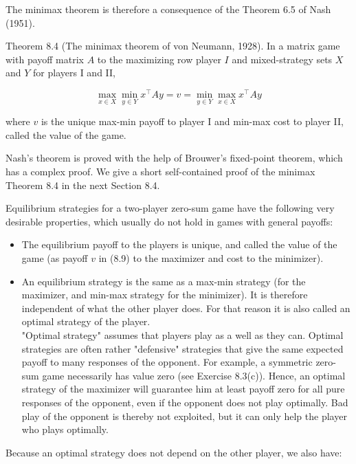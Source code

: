 \documentclass[12pt]{article}
\begin{document}
The minimax theorem is therefore a consequence of the Theorem 6.5 of Nash (1951).

Theorem 8.4 (The minimax theorem of von Neumann, 1928). In a matrix game with payoff matrix $A$ to the maximizing row player $I$ and mixed-strategy sets $X$ and $Y$ for players I and II,


\begin{equation*}
\max _{x \in X} \min _{y \in Y} x^{\top} A y=v=\min _{y \in Y} \max _{x \in X} x^{\top} A y \tag{8.9}
\end{equation*}


where $v$ is the unique max-min payoff to player I and min-max cost to player II, called the value of the game.

Nash's theorem is proved with the help of Brouwer's fixed-point theorem, which has a complex proof. We give a short self-contained proof of the minimax Theorem 8.4 in the next Section 8.4.

Equilibrium strategies for a two-player zero-sum game have the following very desirable properties, which usually do not hold in games with general payoffs:

\begin{itemize}
  \item The equilibrium payoff to the players is unique, and called the value of the game (as payoff $v$ in (8.9) to the maximizer and cost to the minimizer).
  \item An equilibrium strategy is the same as a max-min strategy (for the maximizer, and min-max strategy for the minimizer). It is therefore independent of what the other player does. For that reason it is also called an optimal strategy of the player.\\
"Optimal strategy" assumes that players play as a well as they can. Optimal strategies are often rather "defensive" strategies that give the same expected payoff to many responses of the opponent. For example, a symmetric zero-sum game necessarily has value zero (see Exercise 8.3(c)). Hence, an optimal strategy of the maximizer will guarantee him at least payoff zero for all pure responses of the opponent, even if the opponent does not play optimally. Bad play of the opponent is thereby not exploited, but it can only help the player who plays optimally.
\end{itemize}

Because an optimal strategy does not depend on the other player, we also have:
\end{document}
